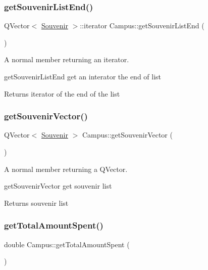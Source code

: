 \subsubsection{\texorpdfstring{get\+Souvenir\+List\+End()}{getSouvenirListEnd()}}
{\footnotesize\ttfamily Q\+Vector$<$ \hyperlink{class_souvenir}{Souvenir} $>$\+::iterator Campus\+::get\+Souvenir\+List\+End (\begin{DoxyParamCaption}{ }\end{DoxyParamCaption})}



A normal member returning an iterator. 

get\+Souvenir\+List\+End get an interator the end of list \begin{DoxyReturn}{Returns}
iterator of the end of the list 
\end{DoxyReturn}
\mbox{\label{class_campus_aae9e2dbb9a5188cbfbc30bb2a89195a3}} 
\subsubsection{\texorpdfstring{get\+Souvenir\+Vector()}{getSouvenirVector()}}
{\footnotesize\ttfamily Q\+Vector$<$ \hyperlink{class_souvenir}{Souvenir} $>$ Campus\+::get\+Souvenir\+Vector (\begin{DoxyParamCaption}{ }\end{DoxyParamCaption})}



A normal member returning a Q\+Vector. 

get\+Souvenir\+Vector get souvenir list \begin{DoxyReturn}{Returns}
souvenir list 
\end{DoxyReturn}
\mbox{\label{class_campus_a87c0b0ac49c8afb595300a6cf02d2209}} 
\subsubsection{\texorpdfstring{get\+Total\+Amount\+Spent()}{getTotalAmountSpent()}}
{\footnotesize\ttfamily double Campus\+::get\+Total\+Amount\+Spent (\begin{DoxyParamCaption}{ }\end{DoxyParamCaption})}



